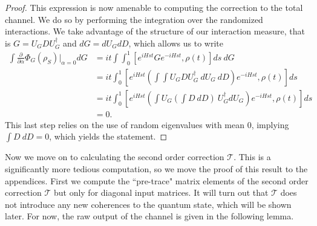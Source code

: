 \documentclass{article}
\newcommand{\parens}[1]{\left( #1 \right)}
\begin{document}
\begin{proof}
    This expression is now amenable to computing the correction to the total channel. We do so by performing the integration over the randomized interactions. We take advantage of the structure of our interaction measure, that is $G = U_G D U_G^\dagger$ and $dG = dU_G dD$, which allows us to write
    \begin{align}
        \int \frac{\partial}{\partial \alpha} \Phi_G(\rho_S) \bigg|_{\alpha = 0} dG &= it \int \int_0^1 \left[ e^{i H s t} G e^{-i H s t}, \rho(t) \right] ds ~dG \\
        &= it \int_0^1 \left[ e^{i H s t} \parens{\int \int U_G D U_G^\dagger ~dU_G ~ dD} e^{-i H s t}, \rho(t)  \right] ds \\
        &= i t \int_0^1 \left[ e^{i H s t} \parens{\int U_G \parens{\int D ~ dD} ~ U_G^\dagger dU_G } e^{-i H s t}, \rho(t) \right] ds \\
        &= 0.
    \end{align}
    This last step relies on the use of random eigenvalues with mean 0, implying $\int D ~dD = 0$, which yields the statement.
\end{proof}

Now we move on to calculating the second order correction $\mathcal{T}$. This is a significantly more tedious computation, so we move the proof of this result to the appendices. First we compute the ``pre-trace" matrix elements of the second order correction $\mathcal{T}$ but only for diagonal input matrices. It will turn out that $\mathcal{T}$ does not introduce any new coherences to the quantum state, which will be shown later. For now, the raw output of the channel is given in the following lemma.
\end{document}
